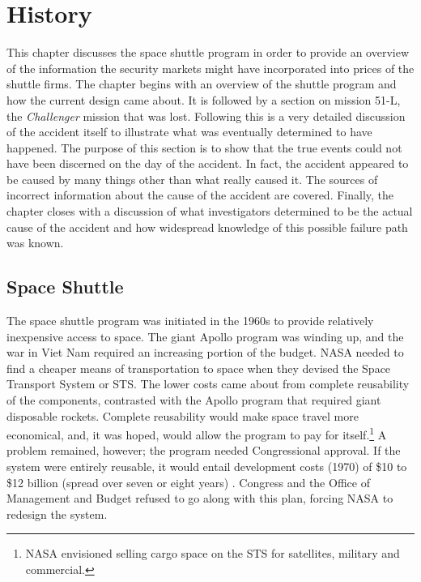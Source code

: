 \chapter{History}\label{history}

This chapter discusses the space shuttle program in order to provide an overview of the information the security markets might have incorporated into prices of the shuttle firms. The chapter begins with an overview of the shuttle program and how the current design came about. It is followed by a section on mission 51-L, the {\em Challenger} mission that was lost. Following this is a very detailed discussion of the accident itself to illustrate what was eventually determined to have happened. The purpose of this section is to show that the true events could not have been discerned on the day of the accident. In fact, the accident appeared to be caused by many things other than what really caused it. The sources of incorrect information about the cause of the accident are covered. Finally, the chapter closes with a discussion of what investigators determined to be the actual cause of the accident and how widespread knowledge of this possible failure path was known.

\section{Space Shuttle}

The space shuttle program was initiated in the 1960s to provide relatively inexpensive access to space. The giant Apollo program was winding up, and the war in Viet Nam required an increasing portion of the budget. NASA needed to find a cheaper means of transportation to space when they devised the Space Transport System or STS. The lower costs came about from complete reusability of the components, contrasted with the Apollo program that required giant disposable rockets. Complete reusability would make space travel more economical, and, it was hoped, would allow the program to pay for itself.\footnote{NASA envisioned selling cargo space on the STS for satellites, military and commercial.} A problem remained, however; the program needed Congressional approval. If the system were entirely reusable, it would entail development costs (1970) of \$10 to \$12 billion (spread over seven or eight years) \cite[p. 57]{lewis}. Congress and the Office of Management and Budget refused to go along with this plan, forcing NASA to redesign the system.

